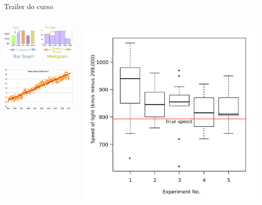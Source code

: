 \documentclass{beamer}
\begin{document}
\begin{frame}{Trailer do curso}
  \begin{columns}
    \begin{column}{5cm}
      \begin{center}
        \includegraphics[width=.9\textwidth]{Intro/bar-chart-vs-histogram}

      \bigskip
      \bigskip
      \includegraphics[width=.9\textwidth]{Intro/mean-sea-level-line}
      \end{center}
    \end{column}
    \begin{column}{6cm}
      \begin{center}
        \includegraphics[width=.7\textwidth]{Intro/boxplot}


\end{center}
\end{column}
\end{columns}
\end{frame}
\end{document}
